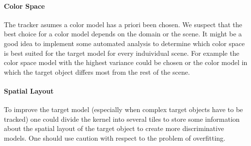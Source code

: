 \documentclass[11pt]{article}
\begin{document}
\paragraph{Color Space} The tracker asumes a color model has a priori been
chosen. We suspect that the best choice for a color model depends on the domain
or the scene. It might be a good idea to implement some automated analysis to
determine which color space is best suited for the target model for every
induividual scene. For example the color space model with the highest variance
could be chosen or the color model in which the target object differs most from
the rest of the scene.

\paragraph{Spatial Layout} To improve the target model (especially when complex
target objects have to be tracked) one could divide the kernel into several
tiles to store some information about the spatial layout of the target object
to create more discriminative models. One should use caution with respect to
the problem of overfitting.

\renewcommand\bibname{References}


\end{document}

